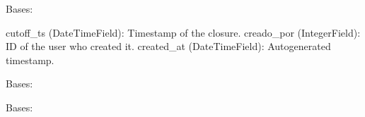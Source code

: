 \documentclass[a4paper,11pt,spanish]{sphinxmanual}
\begin{document}
\begin{fulllineitems}
\label{\detokenize{api/inventory/inventory.models:inventory.models.InventoryPeriodSnapshot}}
\pysigstartsignatures
\pysiglinewithargsret
{}
{\sphinxparamcomma {}}
{}
\pysigstopsignatures
\sphinxAtStartPar
Bases: 
\begin{description}
\sphinxAtStartPar
cutoff\_ts (DateTimeField): Timestamp of the closure.
creado\_por (IntegerField): ID of the user who created it.
created\_at (DateTimeField): Auto\sphinxhyphen{}generated timestamp.

\end{description}

\begin{fulllineitems}
\label{\detokenize{api/inventory/inventory.models:inventory.models.InventoryPeriodSnapshot.DoesNotExist}}
\pysigstartsignatures
\pysigline
{}
\pysigstopsignatures
\sphinxAtStartPar
Bases: 

\end{fulllineitems}


\begin{fulllineitems}
\label{\detokenize{api/inventory/inventory.models:inventory.models.InventoryPeriodSnapshot.MultipleObjectsReturned}}
\pysigstartsignatures
\pysigline
{}
\pysigstopsignatures
\sphinxAtStartPar
Bases: 

\end{fulllineitems}



\end{fulllineitems}
\end{document}

